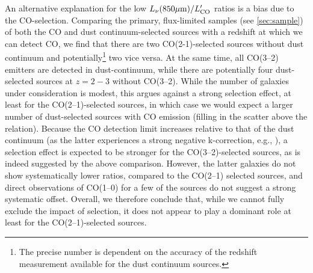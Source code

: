 \documentclass[twocolumn]{aastex62}
\begin{document}
An alternative explanation for the low
$L_{\nu}(850\mu {\rm m})/L'_{\mathrm{CO}}$ ratios is a bias due to the
CO-selection.  Comparing the primary, flux-limited samples (see
\autoref{sec:sample}) of both the CO and dust continuum-selected sources with a
redshift at which we can detect CO, we find that there are two CO(2-1)-selected
sources without dust continuum and potentially\footnote{The precise number is
  dependent on the accuracy of the redshift measurement available for the dust
  continuum sources.} two vice versa.  At the same time, all CO(3--2) emitters
are detected in dust-continuum, while there are potentially four dust-selected
sources at $z=2-3$ without CO(3--2).  While the number of galaxies under
consideration is modest, this argues against a strong selection effect, at
least for the CO(2--1)-selected sources, in which case we would expect a larger
number of dust-selected sources with CO emission (filling in the scatter above
the relation).  Because the CO detection limit increases relative to that of
the dust continuum (as the latter experiences a strong negative k-correction,
e.g., \citealt{Blain2002}), a selection effect is expected to be stronger for
the CO(3--2)-selected sources, as is indeed suggested by the above comparison.
However, the latter galaxies do not show systematically lower ratios, compared
to the CO(2--1) selected sources, and direct observations of CO(1--0) for a few
of the sources do not suggest a strong systematic offset.  Overall, we
therefore conclude that, while we cannot fully exclude the impact of selection,
it does not appear to play a dominant role at least for the CO(2--1)-selected
sources.
\end{document}
